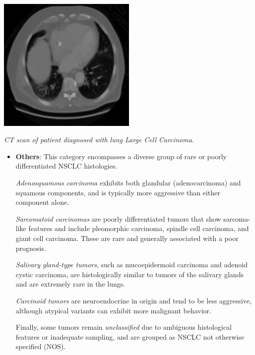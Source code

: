 \vspace{1em}
\begin{center}
    \includegraphics[width=0.5\textwidth]{../assets/01-overview/lc-lcc-ct.jpg}

    \small\textit{CT scan of patient diagnosed with lung Large Cell Carcinoma. 
    \cite{SHATNAWI2025100188}}
\end{center}
\vspace{1em}

\begin{itemize}
    \item \textbf{Others}: This category encompasses a diverse group of rare or poorly 
    differentiated NSCLC histologies.
    
    \textit{Adenosquamous carcinoma} exhibits both glandular (adenocarcinoma) and squamous 
    components, and is typically more aggressive than either component alone.
    
    \textit{Sarcomatoid carcinomas} are poorly differentiated tumors that show sarcoma-like features 
    and include pleomorphic carcinoma, spindle cell carcinoma, and giant cell carcinoma. These are 
    rare and generally associated with a poor prognosis.
    
    \textit{Salivary gland-type tumors}, such as mucoepidermoid carcinoma and adenoid cystic 
    carcinoma, are histologically similar to tumors of the salivary glands and are extremely rare in 
    the lungs.
    
    \textit{Carcinoid tumors} are neuroendocrine in origin and tend to be less aggressive, although 
    atypical variants can exhibit more malignant behavior.
    
    Finally, some tumors remain \textit{unclassified} due to ambiguous histological features or 
    inadequate sampling, and are grouped as NSCLC not otherwise specified (NOS). \cite{travis2015}
\end{itemize}

